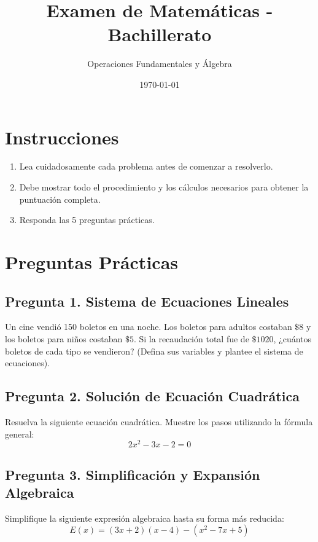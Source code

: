 \documentclass{article}
\begin{document}
\title{Examen de Matemáticas - Bachillerato}
\author{Operaciones Fundamentales y Álgebra}
\date{\today}
\maketitle

\section*{Instrucciones}
\begin{enumerate}
    \item Lea cuidadosamente cada problema antes de comenzar a resolverlo.
    \item Debe mostrar todo el procedimiento y los cálculos necesarios para obtener la puntuación completa.
    \item Responda las 5 preguntas prácticas.
\end{enumerate}

\vspace{0.5cm}

\section*{Preguntas Prácticas}

\subsection*{Pregunta 1. Sistema de Ecuaciones Lineales}
Un cine vendió 150 boletos en una noche. Los boletos para adultos costaban $\$8$ y los boletos para niños costaban $\$5$. Si la recaudación total fue de $\$1020$, ¿cuántos boletos de cada tipo se vendieron? (Defina sus variables y plantee el sistema de ecuaciones).

\vspace{2.0cm} %

\subsection*{Pregunta 2. Solución de Ecuación Cuadrática}
Resuelva la siguiente ecuación cuadrática. Muestre los pasos utilizando la fórmula general:
$$2x^2 - 3x - 2 = 0$$

\vspace{2.0cm}

\subsection*{Pregunta 3. Simplificación y Expansión Algebraica}
Simplifique la siguiente expresión algebraica hasta su forma más reducida:
$$E(x) = (3x + 2)(x - 4) - (x^2 - 7x + 5)$$
\end{document}
